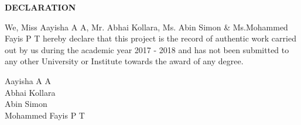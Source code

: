 \centerline{\large{\bfseries{DECLARATION}}}

\hspace{1in}

\normalsize

We, Miss Aayisha A A, Mr. Abhai Kollara, Ms. Abin Simon & Ms.Mohammed Fayis P T  hereby declare that this project is the record of authentic work carried out by us during the academic year 2017 - 2018 and has not been submitted to any other University or Institute towards the award of any degree.

\begin{flushright} Aayisha A A\\
Abhai Kollara\\
Abin Simon\\
Mohammed Fayis P T
\end{flushright}
